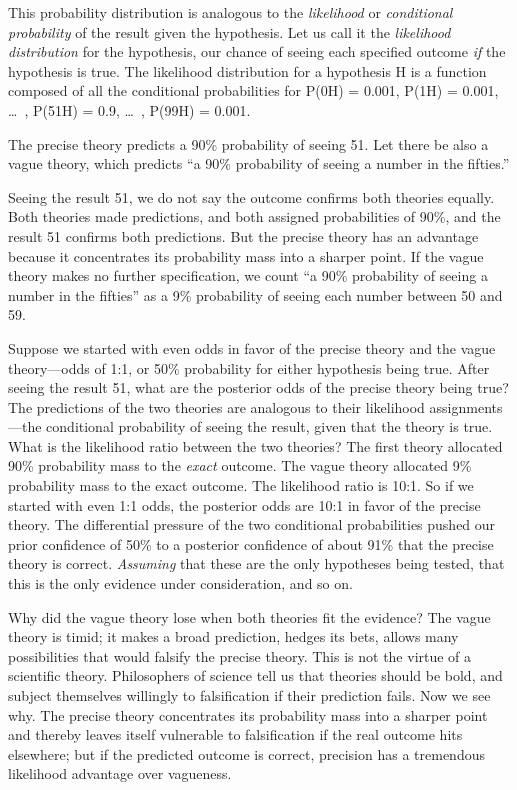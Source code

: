 {
 This probability distribution is analogous to the
\textit{likelihood} or \textit{conditional probability} of the result
given the hypothesis. Let us call it the \textit{likelihood
distribution} for the hypothesis, our chance of seeing each specified
outcome \textit{if} the hypothesis is true. The likelihood distribution
for a hypothesis H is a function composed of all the conditional
probabilities for P(0{\textbar}H) = 0.001, P(1{\textbar}H) = 0.001,
\ldots~, P(51{\textbar}H) = 0.9, \ldots~, P(99{\textbar}H) = 0.001.}

{
 The precise theory predicts a 90\% probability of seeing 51. Let
there be also a vague theory, which predicts ``a 90\%
probability of seeing a number in the fifties.''}

{
 Seeing the result 51, we do not say the outcome confirms both
theories equally. Both theories made predictions, and both assigned
probabilities of 90\%, and the result 51 confirms both predictions. But
the precise theory has an advantage because it concentrates its
probability mass into a sharper point. If the vague theory makes no
further specification, we count ``a 90\% probability
of seeing a number in the fifties'' as a 9\%
probability of seeing each number between 50 and 59.}

{
 Suppose we started with even odds in favor of the precise theory
and the vague theory---odds of 1:1, or 50\% probability for either
hypothesis being true. After seeing the result 51, what are the
posterior odds of the precise theory being true? The predictions of the
two theories are analogous to their likelihood assignments---the
conditional probability of seeing the result, given that the theory is
true. What is the likelihood ratio between the two theories? The first
theory allocated 90\% probability mass to the \textit{exact} outcome.
The vague theory allocated 9\% probability mass to the exact outcome.
The likelihood ratio is 10:1. So if we started with even 1:1 odds, the
posterior odds are 10:1 in favor of the precise theory. The
differential pressure of the two conditional probabilities pushed our
prior confidence of 50\% to a posterior confidence of about 91\% that
the precise theory is correct. \textit{Assuming} that these are the
only hypotheses being tested, that this is the only evidence under
consideration, and so on.}

{
 Why did the vague theory lose when both theories fit the evidence?
The vague theory is timid; it makes a broad prediction, hedges its
bets, allows many possibilities that would falsify the precise theory.
This is not the virtue of a scientific theory. Philosophers of science
tell us that theories should be bold, and subject themselves willingly
to falsification if their prediction fails. Now we
see why. The precise theory concentrates its probability mass into a
sharper point and thereby leaves itself vulnerable to falsification if
the real outcome hits elsewhere; but if the predicted outcome is
correct, precision has a tremendous likelihood advantage over
vagueness.}

